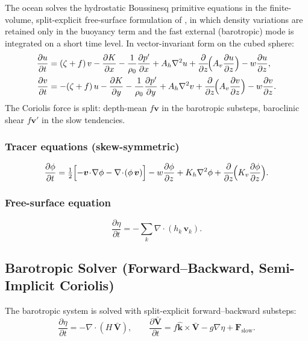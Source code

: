\documentclass[11pt,a4paper]{article}
\newcommand{\pp}{\partial}
\newcommand{\half}{\tfrac{1}{2}}
\begin{document}
The ocean solves the hydrostatic Boussinesq primitive equations in the
finite-volume, split-explicit free-surface formulation of
\citet{Marshall1997}, in which density variations are retained only in
the buoyancy term and the fast external (barotropic) mode is integrated
on a short time level.  In vector-invariant form on the cubed sphere:
\begin{align}
  \frac{\pp u}{\pp t} &= (\zeta+f)\,v - \frac{\pp K}{\pp x} - \frac{1}{\rho_0}\frac{\pp p'}{\pp x} + A_h\nabla^2 u + \frac{\pp}{\pp z}\!\Bigl(A_v\frac{\pp u}{\pp z}\Bigr) - w\frac{\pp u}{\pp z}, \\
  \frac{\pp v}{\pp t} &= -(\zeta+f)\,u - \frac{\pp K}{\pp y} - \frac{1}{\rho_0}\frac{\pp p'}{\pp y} + A_h\nabla^2 v + \frac{\pp}{\pp z}\!\Bigl(A_v\frac{\pp v}{\pp z}\Bigr) - w\frac{\pp v}{\pp z}.
\end{align}
The Coriolis force is split: depth-mean $f\bm v$ in the barotropic substeps, baroclinic shear $f\bm v'$ in the slow tendencies.

\subsubsection{Tracer equations (skew-symmetric)}
\begin{equation}
  \frac{\pp\phi}{\pp t} = \half\Bigl[-\bm v\!\cdot\!\nabla\phi - \nabla\!\cdot\!(\phi\,\bm v)\Bigr]
  - w\frac{\pp\phi}{\pp z} + K_h\nabla^2\phi + \frac{\pp}{\pp z}\!\Bigl(K_v\frac{\pp\phi}{\pp z}\Bigr).
\end{equation}

\subsubsection{Free-surface equation}
\begin{equation}
  \frac{\pp\eta}{\pp t} = -\sum_k \nabla\!\cdot\!(h_k\,\bm v_k).
\end{equation}

\subsection{Barotropic Solver (Forward--Backward, Semi-Implicit Coriolis)}

The barotropic system is solved with split-explicit forward--backward substeps:
\begin{equation}
  \frac{\pp\eta}{\pp t} = -\nabla\!\cdot\!(H\,\bar{\bm V}),
  \qquad
  \frac{\pp\bar{\bm V}}{\pp t} = f\hat{\bm k}\times\bar{\bm V} - g\nabla\eta + \bm F_{\mathrm{slow}}.
\end{equation}
\end{document}
